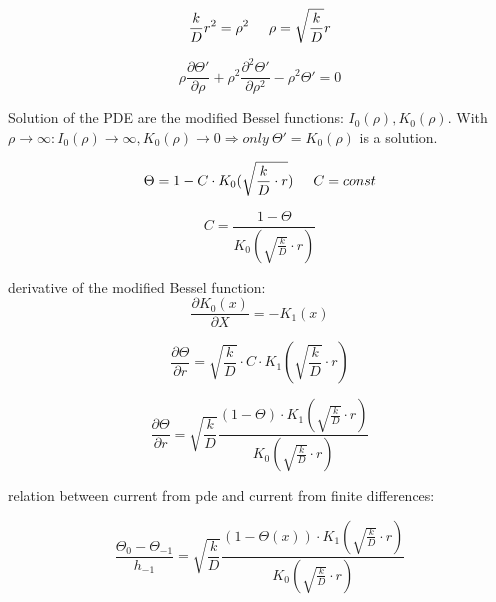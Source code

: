 \begin{equation}
\frac{k}{D}r^2 = \rho^2 \hspace{0.5cm} \rho = \sqrt{\frac{k}{D}}r
\end{equation}

\begin{equation}
\rho\frac{\partial\Theta'}{\partial \rho} + \rho^2\frac{\partial^2\Theta'}{\partial \rho^2} - \rho^2\Theta' = 0
\end{equation}

Solution of the PDE are the modified Bessel functions: \begin{math} I_0(\rho), K_0(\rho) \end{math}. With \begin{math} \rho \to \infty: I_0(\rho) \to \infty, K_0(\rho) \to 0 \Rightarrow only~ \Theta' = K_0(\rho) \end{math} is a solution.

\begin{equation}
\Theta = 1 - C\cdot K_0(\sqrt{\frac{k}{D}\cdot r}) \hspace{0.5cm} C = const
\end{equation}

\begin{equation}
C = \frac{1-\Theta}{K_0(\sqrt{\frac{k}{D}}\cdot r)}
\end{equation}

derivative of the modified Bessel function:
\begin{equation}
\frac{\partial K_0(x)}{\partial X} = - K_1(x)
\end{equation}

\begin{equation}
\frac{\partial \Theta}{\partial r} = \sqrt{\frac{k}{D}}\cdot C \cdot K_1(\sqrt{\frac{k}{D}}\cdot r)
\end{equation}

\begin{equation}
\frac{\partial \Theta}{\partial r} = \sqrt{\frac{k}{D}} \frac{(1-\Theta)\cdot K_1(\sqrt{\frac{k}{D}}\cdot r)}{K_0(\sqrt{\frac{k}{D}}\cdot r)}
\end{equation}

relation between current from pde and current from finite differences:

\begin{equation}
\frac{\Theta_0 - \Theta_{-1}}{h_{-1}} = \sqrt{\frac{k}{D}} \frac{(1-\Theta(x))\cdot K_1(\sqrt{\frac{k}{D}}\cdot r)}{K_0(\sqrt{\frac{k}{D}}\cdot r)}
\end{equation}

